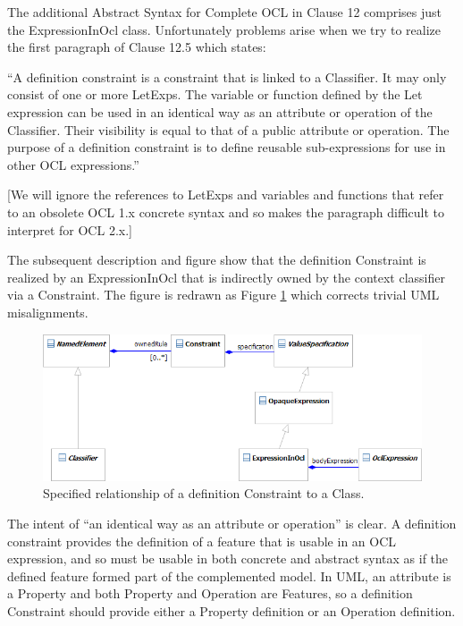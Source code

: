 \documentclass{eceasst}
\begin{document}
The additional Abstract Syntax for Complete OCL in Clause 12 comprises just the ExpressionInOcl class. Unfortunately problems arise when we try to realize the first paragraph of Clause 12.5 which states:

``A definition constraint is a constraint that is linked to a Classifier. It may only consist of one or more LetExps. The
variable or function defined by the Let expression can be used in an identical way as an attribute or operation of the
Classifier. Their visibility is equal to that of a public attribute or operation. The purpose of a definition constraint is to
define reusable sub-expressions for use in other OCL expressions.''

[We will ignore the references to LetExps and variables and functions that refer to an obsolete OCL 1.x concrete syntax and so makes the paragraph difficult to interpret for OCL 2.x.]

The subsequent description and figure show that the definition Constraint is realized by an ExpressionInOcl that is indirectly owned by the context classifier via a Constraint. The figure is redrawn as Figure \ref{fig:Definition} which corrects trivial UML misalignments. 

\begin{figure}
  \begin{center}
    \includegraphics[width=5.0in]{Definition.png}
  \end{center}
  \caption{Specified relationship of a definition Constraint to a Class.}
  \label{fig:Definition}
\end{figure}

The intent of ``an identical way as an attribute or operation'' is clear. A definition constraint provides the definition of a feature that is usable in an OCL expression, and so must be usable in both concrete and abstract syntax as if the defined feature formed part of the complemented model. In UML, an attribute is a Property and both Property and Operation are Features, so a definition Constraint should provide either a Property definition or an Operation definition.
\end{document}

